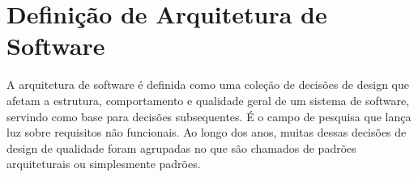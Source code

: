 \section{Definição de Arquitetura de Software}

A arquitetura de software é definida como uma coleção de decisões de design que afetam a estrutura, comportamento e qualidade geral de um sistema de software, servindo como base para decisões subsequentes. É o campo de pesquisa que lança luz sobre requisitos não funcionais. Ao longo dos anos, muitas dessas decisões de design de qualidade foram agrupadas no que são chamados de padrões arquiteturais ou simplesmente padrões.
